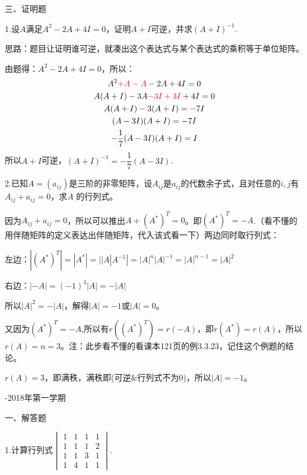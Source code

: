 \documentclass{article}
\begin{document}
三、证明题

1.设$A$满足$A^{2}-2A+4I=0$，证明$A+I$可逆，并求$(A+I)^{-1}$.

\textcolor[rgb]{1.00,0.00,0.00}{思路：题目让证明谁可逆，就凑出这个表达式与某个表达式的乘积等于单位矩阵。}

\begin{zhengming}
由题得：$A^{2}-2A+4I=0$，所以：
\begin{gather*}
  A^{2}\textcolor[rgb]{1.00,0.00,0.00}{+A-A}-2A+4I=0\\
  A(A+I)-3A\textcolor[rgb]{1.00,0.00,0.00}{-3I+3I}+4I=0\\
  A(A+I)-3(A+I)=-7I\\
  (A-3I)(A+I)=-7I\\
  -\frac{1}{7}(A-3I)(A+I)=I
\end{gather*}
所以$A+I$可逆，$(A+I)^{-1}=-\dfrac{1}{7}(A-3I)$.
\end{zhengming}

2.已知$A=(a_{ij})$是三阶的非零矩阵，设$A_{ij}$是$a_{ij}$的代数余子式，且对任意的$i,j$有$A_{ij}+a_{ij}=0$，求$A$ 的行列式。

\begin{jie}
因为$A_{ij}+a_{ij}=0$，所以可以推出$A+(A^*)^T=0$。即$(A^*)^T=-A$.\textcolor[rgb]{1.00,0.00,0.00}{（看不懂的用伴随矩阵的定义表达出伴随矩阵，代入该式看一下）}两边同时取行列式：

左边：$|(A^*)^T|=|A^*|=||A|A^{-1}|=|A|^n|A|^{-1}=|A|^{n-1}=|A|^2$

右边：$|-A|=(-1)^3|A|=-|A|$

所以$|A|^2=-|A|$，解得$|A|=-1$或$|A|=0$。

又因为$(A^*)^T=-A$,所以有$r((A^*)^T)=r(-A)$，即$r(A^*)=r(A)$，所以$r(A)=n=3$。\textcolor[rgb]{1.00,0.00,0.00}{注：此步看不懂的看课本121页的例3.3.23，记住这个例题的结论。}

$r(A)=3$，即满秩，满秩即(可逆$\&$行列式不为$0$)，所以$|A|=-1$。
\end{jie}
\newpage
\hphantom{~~}\hfill {-2018年第一学期} \hfill\hphantom{~~}

一、解答题

1.计算行列式$
\begin{vmatrix}
  1 & 1 & 1 & 1 \\
  1 & 1 & 1& 2 \\
  1 & 1 & 3& 1\\
   1 & 4 &1 &1
\end{vmatrix}
.$
\end{document}
